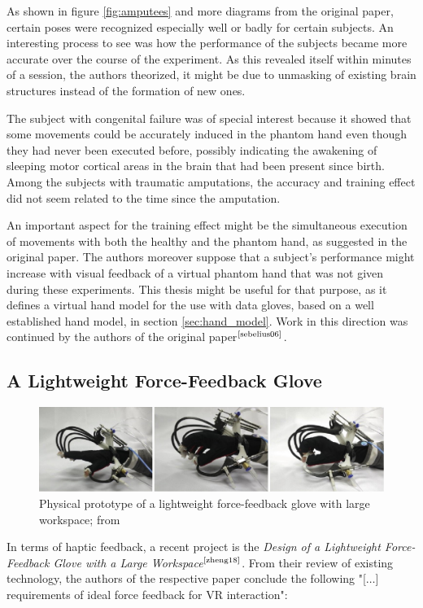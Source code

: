 \documentclass[hyperref, bachelorofscience]{cgvpub}
\newcommand{\newcite}[1]{$ ^{\text{\cite{#1}}} $}
\begin{document}
As shown in figure \ref{fig:amputees} and more diagrams from the original paper, certain poses were recognized especially well or badly for certain subjects. An interesting process to see was how the performance of the subjects became more accurate over the course of the experiment. As this revealed itself within minutes of a session, the authors theorized, it might be due to unmasking of existing brain structures instead of the formation of new ones. 

The subject with congenital failure was of special interest because it showed that some movements could be accurately induced in the phantom hand even though they had never been executed before, possibly indicating the awakening of sleeping motor cortical areas in the brain that had been present since birth. Among the subjects with traumatic amputations, the accuracy and training effect did not seem related to the time since the amputation.

An important aspect for the training effect might be the simultaneous execution of movements with both the healthy and the phantom hand, as suggested in the original paper. The authors moreover suppose that a subject's performance might increase with visual feedback of a virtual phantom hand that was not given during these experiments. This thesis might be useful for that purpose, as it defines a virtual hand model for the use with data gloves, based on a well established hand model, in section \ref{sec:hand_model}. Work in this direction was continued by the authors of the original paper\newcite{sebelius06}.

\subsection{A Lightweight Force-Feedback Glove}
\begin{figure}
	\centering
	\includegraphics{../pics/force_feedback_proto}
	\caption{Physical prototype of a lightweight force-feedback glove with large workspace; from 
		\cite{zheng18}}
	\label{fig:force_feedback_proto}
\end{figure}

In terms of haptic feedback, a recent project is the \emph{Design of a Lightweight Force-Feedback Glove with a Large Workspace}\newcite{zheng18}. From their review of existing technology, the authors of the respective paper conclude the following "[$\dots$] requirements of ideal force feedback for VR interaction":
\end{document}
